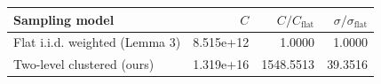 \begin{tabular}{lrrr}
\toprule
Sampling model & $C$ & $C/C_{\mathrm{flat}}$ & $\sigma/\sigma_{\mathrm{flat}}$ \\
\midrule
Flat i.i.d. weighted (Lemma 3) & 8.515e+12 & 1.0000 & 1.0000 \\
Two-level clustered (ours) & 1.319e+16 & 1548.5513 & 39.3516 \\
\bottomrule
\end{tabular}
